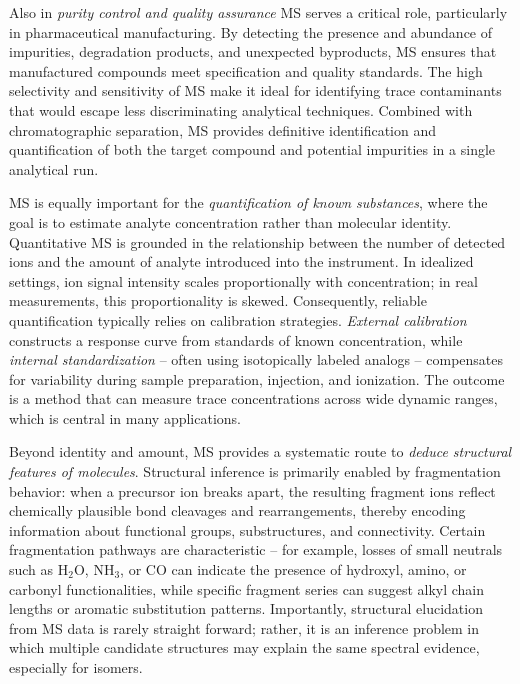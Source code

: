 Also in \emph{purity control and quality assurance} MS serves a critical role, particularly in pharmaceutical manufacturing.
By detecting the presence and abundance of impurities, degradation products, and unexpected byproducts, MS ensures that manufactured compounds meet specification and quality standards.
The high selectivity and sensitivity of MS make it ideal for identifying trace contaminants that would escape less discriminating analytical techniques. Combined with chromatographic separation, MS provides definitive identification and quantification of both the target compound and potential impurities in a single analytical run. \cite[p.~2]{Rambhad2025}

MS is equally important for the \emph{quantification of known substances}, where the goal is to estimate analyte concentration rather than molecular identity. \cite[p.~260]{Hoffmann2011}
Quantitative MS is grounded in the relationship between the number of detected ions and the amount of analyte introduced into the instrument. \cite[p.~261 \& 265-266]{Hoffmann2011}
In idealized settings, ion signal intensity scales proportionally with concentration; in real measurements, this proportionality is skewed.
Consequently, reliable quantification typically relies on calibration strategies.
\emph{External calibration} constructs a response curve from standards of known concentration, while \emph{internal standardization} -- often using isotopically labeled analogs -- compensates for variability during sample preparation, injection, and ionization. \cite[p.~264-268]{Hoffmann2011}
The outcome is a method that can measure trace concentrations across wide dynamic ranges, which is central in many applications.

Beyond identity and amount, MS provides a systematic route to \emph{deduce structural features of molecules}.
Structural inference is primarily enabled by fragmentation behavior: when a precursor ion breaks apart, the resulting fragment ions reflect chemically plausible bond cleavages and rearrangements, thereby encoding information about functional groups, substructures, and connectivity.  \cite[p.~i49]{Boecker2008}
Certain fragmentation pathways are characteristic  -- for example, losses of small neutrals such as $\mathrm{H_2O}$, $\mathrm{NH_3}$, or $\mathrm{CO}$ can indicate the presence of hydroxyl, amino, or carbonyl functionalities, while specific fragment series can suggest alkyl chain lengths or aromatic substitution patterns. \cite[p.~504]{Gross2006}
Importantly, structural elucidation from MS data is rarely straight forward;
rather, it is an inference problem in which multiple candidate structures may explain the same spectral evidence, especially for isomers. \cite[p.~53]{Vaniya2015}

